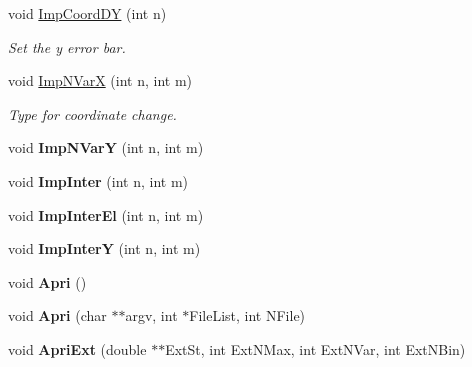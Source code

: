 \begin{DoxyCompactItemize}
\item 
void \hyperlink{classElementiGrafici_a24700e3e45a706f7cc9ecc6a86349aa2}{Imp\+Coord\+DY} (int n)\hypertarget{classElementiGrafici_a24700e3e45a706f7cc9ecc6a86349aa2}{}\label{classElementiGrafici_a24700e3e45a706f7cc9ecc6a86349aa2}

\begin{DoxyCompactList}\small\item\em Set the y error bar. \end{DoxyCompactList}\item 
void \hyperlink{classElementiGrafici_a392a5f9549a38ad82a7f6e4963550aed}{Imp\+N\+VarX} (int n, int m)
\begin{DoxyCompactList}\small\item\em Type for coordinate change. \end{DoxyCompactList}\item 
void {\bfseries Imp\+N\+VarY} (int n, int m)\hypertarget{classElementiGrafici_a29bb5fb3f1cae3a4c778ee4b94b56096}{}\label{classElementiGrafici_a29bb5fb3f1cae3a4c778ee4b94b56096}

\item 
void {\bfseries Imp\+Inter} (int n, int m)\hypertarget{classElementiGrafici_a81bb6df8a851297f9a49c8ba8b4c6a8c}{}\label{classElementiGrafici_a81bb6df8a851297f9a49c8ba8b4c6a8c}

\item 
void {\bfseries Imp\+Inter\+El} (int n, int m)\hypertarget{classElementiGrafici_ae58a48a8d5227bb75ceb9a3fdc46f3e5}{}\label{classElementiGrafici_ae58a48a8d5227bb75ceb9a3fdc46f3e5}

\item 
void {\bfseries Imp\+InterY} (int n, int m)\hypertarget{classElementiGrafici_a142174ea062ee7cd6c8a4567089b7302}{}\label{classElementiGrafici_a142174ea062ee7cd6c8a4567089b7302}

\item 
void {\bfseries Apri} ()\hypertarget{classElementiGrafici_a7ce426fbebfb112e79be160c5dabb7a8}{}\label{classElementiGrafici_a7ce426fbebfb112e79be160c5dabb7a8}

\item 
void {\bfseries Apri} (char $\ast$$\ast$argv, int $\ast$File\+List, int N\+File)\hypertarget{classElementiGrafici_a348285e35871cf0c33b78e99ada91daf}{}\label{classElementiGrafici_a348285e35871cf0c33b78e99ada91daf}

\item 
void {\bfseries Apri\+Ext} (double $\ast$$\ast$Ext\+St, int Ext\+N\+Max, int Ext\+N\+Var, int Ext\+N\+Bin)\hypertarget{classElementiGrafici_afd8f1c7dfdb7c0e0ce1e58abe4c10491}{}\label{classElementiGrafici_afd8f1c7dfdb7c0e0ce1e58abe4c10491}


\end{DoxyCompactItemize}
